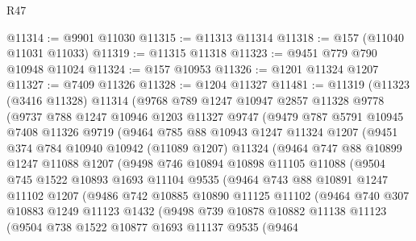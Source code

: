 \begin{lexlean}{R47}
\begin{coremodule}
@11314 := @9901 @11030
@11315 := @11313 @11314
@11318 := @157 (@11040 @11031 @11033)
@11319 := @11315 @11318
@11323 := @9451 @779 @790 @10948 @11024
@11324 := @157 @10953
@11326 := @1201 @11324 @1207
@11327 := @7409 @11326
@11328 := @1204 @11327
@11481 := @11319
    (@11323
      (@3416 @11328)
      @11314
      (@9768
        @789
        @1247
        @10947
        @2857
        @11328
        @9778
        (@9737
          @788
          @1247
          @10946
          @1203
          @11327
          @9747
          (@9479
            @787
            @5791
            @10945
            @7408
            @11326
            @9719
            (@9464
              @785
              @88
              @10943
              @1247
              @11324
              @1207
              (@9451
                @374
                @784
                @10940
                @10942
                (@11089 @1207)
                @11324
                (@9464
                  @747
                  @88
                  @10899
                  @1247
                  @11088
                  @1207
                  (@9498
                    @746
                    @10894
                    @10898
                    @11105
                    @11088
                    (@9504
                      @745
                      @1522
                      @10893
                      @1693
                      @11104
                      @9535
                      (@9464
                        @743
                        @88
                        @10891
                        @1247
                        @11102
                        @1207
                        (@9486
                          @742
                          @10885
                          @10890
                          @11125
                          @11102
                          (@9464
                            @740
                            @307
                            @10883
                            @1249
                            @11123
                            @1432
                            (@9498
                              @739
                              @10878
                              @10882
                              @11138
                              @11123
                              (@9504
                                @738
                                @1522
                                @10877
                                @1693
                                @11137
                                @9535
                                (@9464

\end{coremodule}
\end{lexlean}
